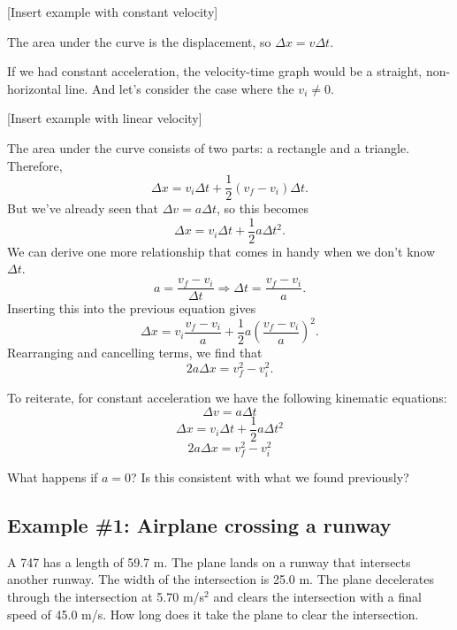 [Insert example with constant velocity]
\vspace{4cm}

The area under the curve is the displacement, so $\Delta{x}=v\Delta{t}$.

If we had constant acceleration, the velocity-time graph would be a straight, non-horizontal line. And let's consider the case where the $v_i\neq{0}$.

[Insert example with linear velocity]
\vspace{4cm}

The area under the curve consists of two parts: a rectangle and a triangle. Therefore,
$$\Delta{x}=v_i\Delta{t}+\frac{1}{2}(v_f-v_i)\Delta{t}.$$
But we've already seen that $\Delta{v}=a\Delta{t}$, so this becomes
$$\Delta{x}=v_i\Delta{t}+\frac{1}{2}a\Delta{t}^2.$$
We can derive one more relationship that comes in handy when we don't know $\Delta{t}$.
$$a=\frac{v_f-v_i}{\Delta{t}}\Rightarrow\Delta{t}=\frac{v_f-v_i}{a}.$$
Inserting this into the previous equation gives
$$\Delta{x}=v_i\frac{v_f-v_i}{a}+\frac{1}{2}a\left(\frac{v_f-v_i}{a}\right)^2.$$
Rearranging and cancelling terms, we find that
$$2a\Delta{x}=v_f^2-v_i^2.$$

To reiterate, for constant acceleration we have the following kinematic equations:
$$\Delta{v}=a\Delta{t}$$
$$\Delta{x}=v_i\Delta{t}+\frac{1}{2}a\Delta{t}^2$$
$$2a\Delta{x}=v_f^2-v_i^2$$

What happens if $a=0$? Is this consistent with what we found previously?





\subsection{Example \#1: Airplane crossing a runway}
A 747 has a length of 59.7 m. The plane lands on a runway that intersects another runway. The width of the intersection is 25.0 m. The plane decelerates through the intersection at 5.70 m/s$^2$ and clears the intersection with a final speed of 45.0 m/s. How long does it take the plane to clear the intersection.

